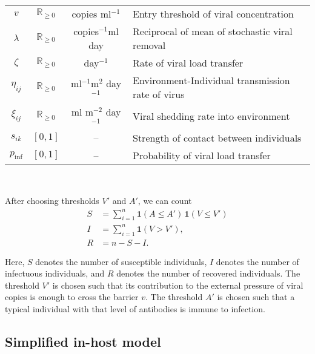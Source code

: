 \documentclass[11pt]{article}
\numberwithin{equation}{subsection}
\newcommand{\iv}{$^{-1}$}
\newcommand{\Rnn}{\mathbb{R}_{\geq 0}}
\begin{document}
\begin{table}[h!]
\begin{tabular}{cccl}
            $v$         & $\Rnn$    & copies ml\iv
                                                & Entry threshold of viral concentration \\
            $\lambda$   & $\Rnn$    & copies\iv ml day
                                    & Reciprocal of mean of stochastic viral removal \\
            $\zeta$     & $\Rnn$    & day\iv
                                                & Rate of viral load transfer \\
            $\eta_{ij}$ & $\Rnn$    & ml\iv m$^2$ day\iv
                                                & Environment-Individual transmission rate of virus\\
            $\xi_{ij}$  & $\Rnn$    & ml m$^{-2}$ day\iv
                                                & Viral shedding rate into environment \\
            $s_{ik}$    & $[0, 1]$  & --
                                    & Strength of contact between individuals \\
            $p_\text{inf}$
                        &$[0, 1]$   & --
                                    & Probability of viral load transfer \\
            \hline
        \end{tabular}
        \label{tab:parameter}
    \end{table}

    ~

    After choosing thresholds $V'$ and $A'$, we can count \begin{align}
        S &= \sum_{i = 1}^n \mathbf{1}(A \leq A')\, \mathbf{1}(V \leq V') \\
        I &= \sum_{i = 1}^n \mathbf{1}(V > V'), \\
        R &= n - S - I.
    \end{align}

    Here, $S$ denotes the number of susceptible individuals, $I$ denotes the
    number of infectuous individuals, and $R$ denotes the number of recovered
    individuals. The threshold $V'$ is chosen such that its contribution to
    the external pressure of viral copies is enough to cross the barrier $v$.
    The threshold $A'$ is chosen such that a typical individual with that
    level of antibodies is immune to infection.


    \subsection{Simplified in-host model} \label{model:inhost}
\end{document}
